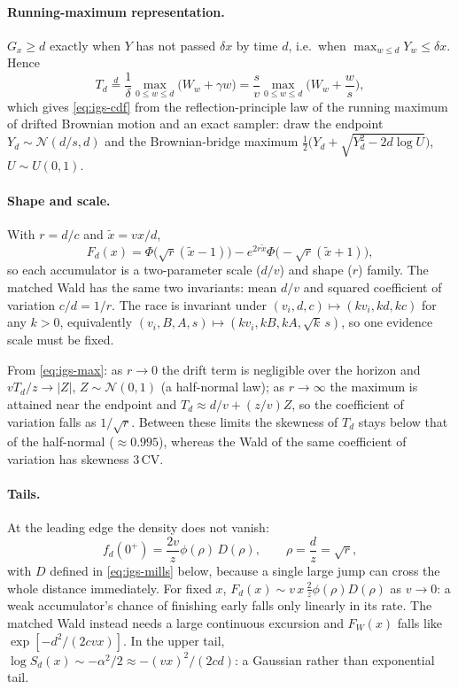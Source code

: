 \documentclass[12pt]{article}
\newcommand{\Normal}{\mathcal{N}}
\newcommand{\PhiN}{\Phi}
\newcommand{\phiN}{\phi}
\begin{document}
\paragraph{Running-maximum representation.}
$G_x\ge d$ exactly when $Y$ has not passed $\delta x$ by time $d$, i.e.\ when $\max_{w\le d}Y_w\le\delta x$. Hence
\begin{equation}
  T_d\overset{d}{=}\frac{1}{\delta}\max_{0\le w\le d}\big(W_w+\gamma w\big)
  =\frac sv\max_{0\le w\le d}\Big(W_w+\frac ws\Big),
  \label{eq:igs-max}
\end{equation}
which gives \eqref{eq:igs-cdf} from the reflection-principle law of the running maximum of drifted Brownian motion and an exact sampler: draw the endpoint $Y_d\sim\Normal(d/s,d)$ and the Brownian-bridge maximum $\tfrac12\big(Y_d+\sqrt{Y_d^2-2d\log U}\big)$, $U\sim U(0,1)$.

\paragraph{Shape and scale.}
With $r=d/c$ and $\tilde x=vx/d$,
\begin{equation}
  F_d(x)=\PhiN\big(\sqrt r(\tilde x-1)\big)-e^{2r\tilde x}\PhiN\big(-\sqrt r(\tilde x+1)\big),
\end{equation}
so each accumulator is a two-parameter scale ($d/v$) and shape ($r$) family. The matched Wald has the same two invariants: mean $d/v$ and squared coefficient of variation $c/d=1/r$. The race is invariant under $(v_i,d,c)\mapsto(kv_i,kd,kc)$ for any $k>0$, equivalently $(v_i,B,A,s)\mapsto(kv_i,kB,kA,\sqrt k\,s)$, so one evidence scale must be fixed.

From \eqref{eq:igs-max}: as $r\to0$ the drift term is negligible over the horizon and $vT_d/z\to|Z|$, $Z\sim\Normal(0,1)$ (a half-normal law); as $r\to\infty$ the maximum is attained near the endpoint and $T_d\approx d/v+(z/v)Z$, so the coefficient of variation falls as $1/\sqrt r$. Between these limits the skewness of $T_d$ stays below that of the half-normal ($\approx0.995$), whereas the Wald of the same coefficient of variation has skewness $3\,\mathrm{CV}$.

\paragraph{Tails.}
At the leading edge the density does not vanish:
\begin{equation}
  f_d(0^+)=\frac{2v}{z}\phiN(\rho)\,D(\rho),\qquad \rho=\frac dz=\sqrt r,
\end{equation}
with $D$ defined in \eqref{eq:igs-mills} below, because a single large jump can cross the whole distance immediately. For fixed $x$, $F_d(x)\sim v\,x\,
\frac{2}{z}\phiN(\rho)D(\rho)$ as $v\to0$: a weak accumulator's chance of
finishing early falls only linearly in its rate. The matched Wald instead needs a large continuous excursion and $F_W(x)$ falls like $\exp[-d^2/(2cvx)]$. In the upper tail, $\log S_d(x)\sim-\alpha^2/2
\approx-(vx)^2/(2cd)$: a Gaussian rather than exponential tail.
\end{document}
